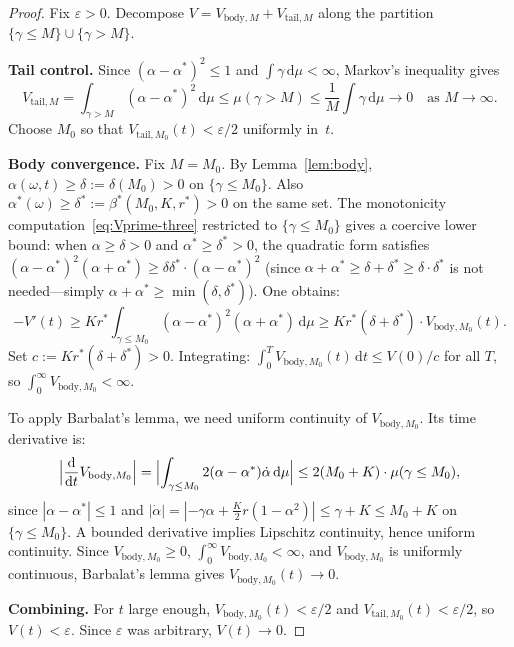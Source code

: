\documentclass[11pt,a4paper]{article}
\theoremstyle{definition}
\begin{document}
\begin{proof}
Fix $\varepsilon>0$. Decompose $V = V_{\mathrm{body},M} + V_{\mathrm{tail},M}$ along the partition $\{\gamma\leq M\}\cup\{\gamma>M\}$.

\textbf{Tail control.} Since $(\alpha-\alpha^*)^2\leq 1$ and $\int\gamma\,\mathrm{d}\mu<\infty$, Markov's inequality gives
\[
V_{\mathrm{tail},M} = \int_{\gamma>M}(\alpha-\alpha^*)^2\,\mathrm{d}\mu \leq \mu(\gamma>M) \leq \frac{1}{M}\int\gamma\,\mathrm{d}\mu \to 0 \quad\text{as } M\to\infty.
\]
Choose $M_0$ so that $V_{\mathrm{tail},M_0}(t)<\varepsilon/2$ uniformly in~$t$.

\textbf{Body convergence.} Fix $M=M_0$. By Lemma~\ref{lem:body}, $\alpha(\omega,t)\geq\delta:=\delta(M_0)>0$ on $\{\gamma\leq M_0\}$. Also $\alpha^*(\omega)\geq\delta^*:=\beta^*(M_0,K,r^*)>0$ on the same set. The monotonicity computation~\eqref{eq:Vprime-three} restricted to $\{\gamma\leq M_0\}$ gives a coercive lower bound: when $\alpha\geq\delta>0$ and $\alpha^*\geq\delta^*>0$, the quadratic form satisfies $(\alpha-\alpha^*)^2(\alpha+\alpha^*)\geq\delta\delta^*\cdot(\alpha-\alpha^*)^2$ (since $\alpha+\alpha^*\geq\delta+\delta^*\geq\delta\cdot\delta^*$ is not needed---simply $\alpha+\alpha^*\geq\min(\delta,\delta^*)$). One obtains:
\[
-V'(t) \geq Kr^*\int_{\gamma\leq M_0}(\alpha-\alpha^*)^2(\alpha+\alpha^*)\,\mathrm{d}\mu \geq Kr^*(\delta+\delta^*)\cdot V_{\mathrm{body},M_0}(t).
\]
Set $c:=Kr^*(\delta+\delta^*)>0$. Integrating: $\int_0^T V_{\mathrm{body},M_0}(t)\,\mathrm{d}t \leq V(0)/c$ for all $T$, so $\int_0^\infty V_{\mathrm{body},M_0}<\infty$.

To apply Barbalat's lemma, we need uniform continuity of $V_{\mathrm{body},M_0}$. Its time derivative is:
\[
\Bigl|\frac{\mathrm{d}}{\mathrm{d}t}V_{\mathrm{body},M_0}\Bigr| = \Bigl|\int_{\gamma\leq M_0}2(\alpha-\alpha^*)\dot\alpha\,\mathrm{d}\mu\Bigr| \leq 2(M_0+K)\cdot\mu(\gamma\leq M_0),
\]
since $|\alpha-\alpha^*|\leq 1$ and $|\dot\alpha|=|-\gamma\alpha+\tfrac{K}{2}r(1-\alpha^2)|\leq\gamma+K\leq M_0+K$ on $\{\gamma\leq M_0\}$. A bounded derivative implies Lipschitz continuity, hence uniform continuity. Since $V_{\mathrm{body},M_0}\geq 0$, $\int_0^\infty V_{\mathrm{body},M_0}<\infty$, and $V_{\mathrm{body},M_0}$ is uniformly continuous, Barbalat's lemma gives $V_{\mathrm{body},M_0}(t)\to 0$.

\textbf{Combining.} For $t$ large enough, $V_{\mathrm{body},M_0}(t)<\varepsilon/2$ and $V_{\mathrm{tail},M_0}(t)<\varepsilon/2$, so $V(t)<\varepsilon$. Since $\varepsilon$ was arbitrary, $V(t)\to 0$.
\end{proof}
\end{document}
